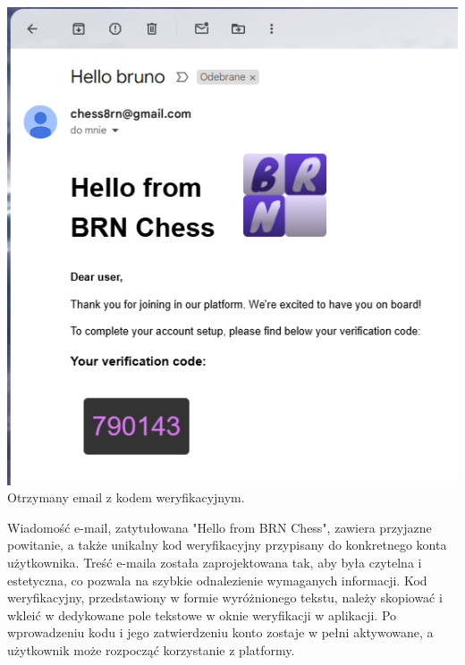 \documentclass[12pt,a4paper]{article}
\begin{document}
\vspace{1cm}

\begin{minipage}[t]{0.35\textwidth} 
    \vspace{0pt} 
    \centering 
    \includegraphics[width=\linewidth]{images/ins_min_mail.png} 
    Otrzymany email z kodem weryfikacyjnym.
\end{minipage} 
\hfill 
\begin{minipage}[t]{0.55\textwidth} 
    \vspace{0pt} 
    \justifying 
    \noindent 
    Wiadomość e-mail, zatytułowana "Hello from BRN Chess", zawiera przyjazne powitanie, a także unikalny kod weryfikacyjny przypisany do konkretnego konta użytkownika. Treść e-maila została zaprojektowana tak, aby była czytelna i estetyczna, co pozwala na szybkie odnalezienie wymaganych informacji. Kod weryfikacyjny, przedstawiony w formie wyróżnionego tekstu, należy skopiować i wkleić w dedykowane pole tekstowe w oknie weryfikacji w aplikacji. Po wprowadzeniu kodu i jego zatwierdzeniu konto zostaje w pełni aktywowane, a użytkownik może rozpocząć korzystanie z platformy. 
\end{minipage}

\vspace{1cm}
\end{document}

